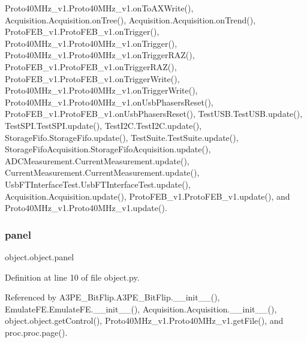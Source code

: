Proto40\+M\+Hz\+\_\+v1.\+Proto40\+M\+Hz\+\_\+v1.\+on\+To\+A\+X\+Write(), Acquisition.\+Acquisition.\+on\+Tree(), Acquisition.\+Acquisition.\+on\+Trend(), Proto\+F\+E\+B\+\_\+v1.\+Proto\+F\+E\+B\+\_\+v1.\+on\+Trigger(), Proto40\+M\+Hz\+\_\+v1.\+Proto40\+M\+Hz\+\_\+v1.\+on\+Trigger(), Proto40\+M\+Hz\+\_\+v1.\+Proto40\+M\+Hz\+\_\+v1.\+on\+Trigger\+R\+A\+Z(), Proto\+F\+E\+B\+\_\+v1.\+Proto\+F\+E\+B\+\_\+v1.\+on\+Trigger\+R\+A\+Z(), Proto\+F\+E\+B\+\_\+v1.\+Proto\+F\+E\+B\+\_\+v1.\+on\+Trigger\+Write(), Proto40\+M\+Hz\+\_\+v1.\+Proto40\+M\+Hz\+\_\+v1.\+on\+Trigger\+Write(), Proto40\+M\+Hz\+\_\+v1.\+Proto40\+M\+Hz\+\_\+v1.\+on\+Usb\+Phasers\+Reset(), Proto\+F\+E\+B\+\_\+v1.\+Proto\+F\+E\+B\+\_\+v1.\+on\+Usb\+Phasers\+Reset(), Test\+U\+S\+B.\+Test\+U\+S\+B.\+update(), Test\+S\+P\+I.\+Test\+S\+P\+I.\+update(), Test\+I2\+C.\+Test\+I2\+C.\+update(), Storage\+Fifo.\+Storage\+Fifo.\+update(), Test\+Suite.\+Test\+Suite.\+update(), Storage\+Fifo\+Acquisition.\+Storage\+Fifo\+Acquisition.\+update(), A\+D\+C\+Measurement.\+Current\+Measurement.\+update(), Current\+Measurement.\+Current\+Measurement.\+update(), Usb\+F\+T\+Interface\+Test.\+Usb\+F\+T\+Interface\+Test.\+update(), Acquisition.\+Acquisition.\+update(), Proto\+F\+E\+B\+\_\+v1.\+Proto\+F\+E\+B\+\_\+v1.\+update(), and Proto40\+M\+Hz\+\_\+v1.\+Proto40\+M\+Hz\+\_\+v1.\+update().

\mbox{\label{classobject_1_1object_af27de160eb6fbb9c6b3723bc4ebc8fb5}} 
\subsubsection{\texorpdfstring{panel}{panel}}
{\footnotesize\ttfamily object.\+object.\+panel}



Definition at line 10 of file object.\+py.



Referenced by A3\+P\+E\+\_\+\+Bit\+Flip.\+A3\+P\+E\+\_\+\+Bit\+Flip.\+\_\+\+\_\+init\+\_\+\+\_\+(), Emulate\+F\+E.\+Emulate\+F\+E.\+\_\+\+\_\+init\+\_\+\+\_\+(), Acquisition.\+Acquisition.\+\_\+\+\_\+init\+\_\+\+\_\+(), object.\+object.\+get\+Control(), Proto40\+M\+Hz\+\_\+v1.\+Proto40\+M\+Hz\+\_\+v1.\+get\+File(), and proc.\+proc.\+page().

\mbox{\label{classobject_1_1object_a2a518f960961d791b0f900a90c3cd287}} 
